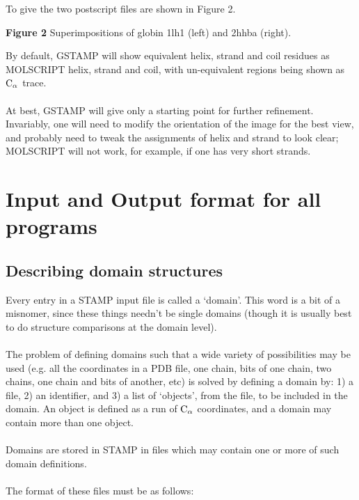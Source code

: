 To give the two postscript files are shown in Figure 2.\\

\vspace*{3.5in}
\noindent
\begin{scriptsize}
{\bf Figure 2} Superimpositions of globin 1lh1 (left) and 2hhba (right).\\
\end{scriptsize}

By default, GSTAMP will show equivalent helix, strand and coil residues
as MOLSCRIPT \al helix, \be strand and coil, with un-equivalent regions 
being shown as ${\rm C}_{\alpha}$ trace.\\
\\
At best, GSTAMP will give only a starting point for further refinement.  
Invariably, one will need to modify the orientation of the image for the 
best view, and probably need to tweak the assignments of helix and strand 
to look clear; MOLSCRIPT will not work, for example, if one has very 
short \be strands.

\chapter{Input and Output format for all programs}

\section{Describing domain structures}

Every entry in a STAMP input file is called a `domain'.  This word
is a bit of a misnomer, since these things needn't be single domains
(though it is usually best to do structure comparisons at the domain level).\\
\\
The problem of defining domains such that a wide variety of 
possibilities may be used (e.g. all the coordinates in a PDB file,
one  chain, bits of one chain, two chains, one chain and bits of
another, etc) is solved by defining a domain by: 1) a file, 2) an
identifier, and 3) a list of `objects', from the file, to be
included in the domain.  An object is defined as a run of ${\rm C}_{\alpha}$
coordinates, and a domain may contain more than one object.\\
\\
Domains are stored in STAMP in files which may contain one or
more of such domain definitions.\\
\\
The format of these files must be as follows:\\

